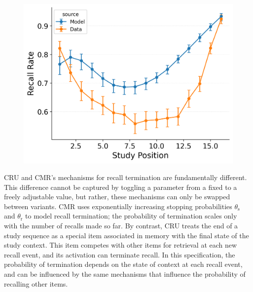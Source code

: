 \documentclass[
  man,
  floatsintext,
  longtable,
  nolmodern,
  notxfonts,
  notimes,
  draftfirst,
  colorlinks=true,linkcolor=blue,citecolor=blue,urlcolor=blue]{apa7}
\begin{document}
\begin{figure}
%
\begin{minipage}{0.33\linewidth}
\includegraphics{figures/HealeyKahana2014_CRU_with_Feature-to-Context__Pre-Expt__Primacy_StartDrift__and_ContextTerm_Fitting_spc.png}\end{minipage}%

\end{figure}%

CRU and CMR's mechanisms for recall termination are fundamentally
different. This difference cannot be captured by toggling a parameter
from a fixed to a freely adjustable value, but rather, these mechanisms
can only be swapped between variants. CMR uses exponentially increasing
stopping probabilities \(\theta_\text{s}\) and \(\theta_\text{r}\) to
model recall termination; the probability of termination scales only
with the number of recalls made so far. By contrast, CRU treats the end
of a study sequence as a special item associated in memory with the
final state of the study context. This item competes with other items
for retrieval at each new recall event, and its activation can terminate
recall. In this specification, the probability of termination depends on
the state of context at each recall event, and can be influenced by the
same mechanisms that influence the probability of recalling other items.
\end{document}
